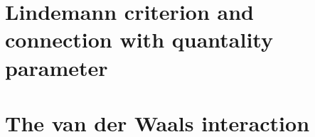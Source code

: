 \begin{subappendices}
\section{Lindemann criterion and connection with quantality parameter}\label{C2AppC}
\section{The van der Waals interaction}\label{C2AppD}













\end{subappendices}









\newpage
 
% 
 

